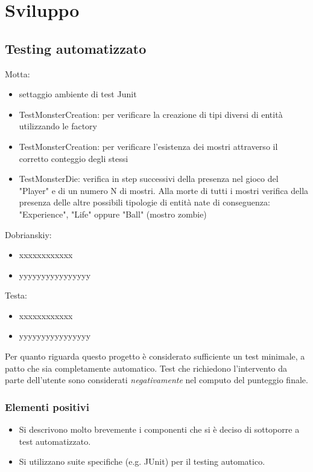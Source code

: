 \documentclass[a4paper,12pt]{report}
\begin{document}
\chapter{Sviluppo}
\section{Testing automatizzato}

Motta:
\begin{itemize}
	\item settaggio ambiente di test Junit
	\item TestMonsterCreation: per verificare la creazione di tipi diversi di entità utilizzando le factory
	\item TestMonsterCreation: per verificare l'esistenza dei mostri attraverso il corretto conteggio degli stessi
	\item TestMonsterDie: verifica in step successivi della presenza nel gioco del "Player" e di un numero N di mostri. Alla morte di tutti i mostri verifica della presenza delle altre possibili tipologie di entità nate di conseguenza: "Experience", "Life" oppure "Ball" (mostro zombie)
\end{itemize}
%
Dobrianskiy:
\begin{itemize}
	\item xxxxxxxxxxxx
	\item yyyyyyyyyyyyyyyy
\end{itemize}
%
Testa:
\begin{itemize}
	\item xxxxxxxxxxxx
	\item yyyyyyyyyyyyyyyy
\end{itemize}
	
Per quanto riguarda questo progetto è considerato sufficiente un test minimale, a patto che sia completamente automatico.
%
Test che richiedono l'intervento da parte dell'utente sono considerati \textit{negativamente} nel computo del punteggio finale.

\subsection*{Elementi positivi}

\begin{itemize}
	\item Si descrivono molto brevemente i componenti che si è deciso di sottoporre a test automatizzato.
	\item Si utilizzano suite specifiche (e.g. JUnit) per il testing automatico.
\end{itemize}
\end{document}
